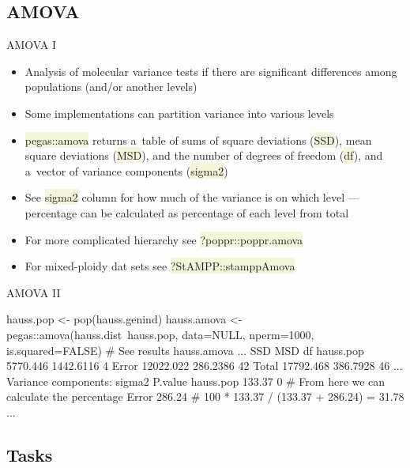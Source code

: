 \documentclass[compress, xelatex, 11pt, xcolor=svgnames, aspectratio=169, url={hyphens, lowtilde}]{beamer}
\renewcommand{\texttt}[1]{\colorbox{Beige}{{\ttfamily #1}}}
\begin{document}
\subsection{AMOVA}

\begin{frame}{AMOVA I}
	\begin{itemize}
		\item Analysis of molecular variance tests if there are significant differences among populations (and/or another levels)
		\item Some implementations can partition variance into various levels
		\item \texttt{pegas::amova} returns a~table of sums of square deviations (\texttt{SSD}), mean square deviations (\texttt{MSD}), and the number of degrees of freedom (\texttt{df}), and a~vector of variance components (\texttt{sigma2})
		\item See \texttt{sigma2} column for how much of the variance is on which level --- percentage can be calculated as percentage of each level from total
		\item For more complicated hierarchy see \texttt{?poppr::poppr.amova}
		\item For mixed-ploidy dat sets see \texttt{?StAMPP::stamppAmova}
	\end{itemize}
\end{frame}

\begin{frame}[fragile]{AMOVA II}
	\begin{spluscode}
    hauss.pop <- pop(hauss.genind)
    hauss.amova <- pegas::amova(hauss.dist~hauss.pop, data=NULL,
      nperm=1000, is.squared=FALSE)
    # See results
    hauss.amova
    ...
                    SSD       MSD df
    hauss.pop  5770.446 1442.6116  4
    Error     12022.022  286.2386 42
    Total     17792.468  386.7928 46
    ...
    Variance components:
              sigma2 P.value
    hauss.pop 133.37       0 # From here we can calculate the percentage
    Error     286.24         # 100 * 133.37 / (133.37 + 286.24) = 31.78 %
    ...
	\end{spluscode}
\end{frame}

\subsection{Tasks}
\end{document}
